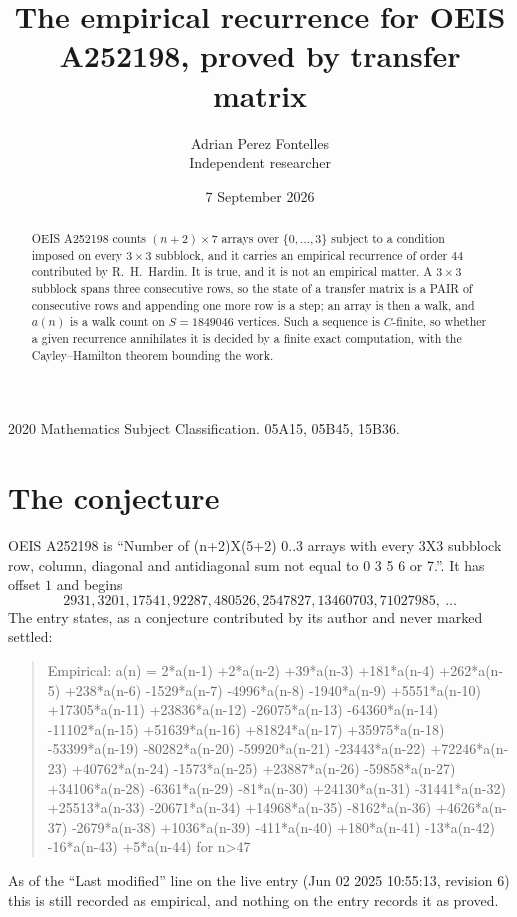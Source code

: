 \documentclass[11pt,a4paper]{article}
\title{The empirical recurrence for OEIS A252198, proved by transfer matrix}
\author{Adrian Perez Fontelles\\ \small Independent researcher}
\date{7 September 2026}
\theoremstyle{plain}
\theoremstyle{definition}
\begin{document}
\maketitle

\begin{abstract}
OEIS A252198 counts $(n+2)\times7$ arrays over $\{0,\dots,3\}$ subject to a condition imposed on
every $3\times3$ subblock, and it carries an empirical recurrence of order $44$
contributed by R.~H.~Hardin. It is true, and it is not an empirical matter. A $3\times3$
subblock spans three consecutive rows, so the state of a transfer matrix is a PAIR of
consecutive rows and appending one more row is a step; an array is then a walk, and
$a(n)$ is a walk count on $S=1849046$ vertices. Such a sequence is $C$-finite, so whether a given
recurrence annihilates it is decided by a finite exact computation, with the Cayley--Hamilton
theorem bounding the work.
\end{abstract}

\noindent\small 2020 Mathematics Subject Classification. 05A15, 05B45, 15B36.\normalsize

\section{The conjecture}

OEIS A252198 is ``Number of (n+2)X(5+2) 0..3 arrays with every 3X3 subblock row, column, diagonal and antidiagonal sum not equal to 0 3 5 6 or 7.''. It has offset $1$ and begins
\[
2931, 3201, 17541, 92287, 480526, 2547827, 13460703, 71027985,\ \dots
\]
The entry states, as a conjecture contributed by its author and never marked settled:
\begin{quote}
Empirical: a(n) = 2*a(n-1) +2*a(n-2) +39*a(n-3) +181*a(n-4) +262*a(n-5) +238*a(n-6) -1529*a(n-7) -4996*a(n-8) -1940*a(n-9) +5551*a(n-10) +17305*a(n-11) +23836*a(n-12) -26075*a(n-13) -64360*a(n-14) -11102*a(n-15) +51639*a(n-16) +81824*a(n-17) +35975*a(n-18) -53399*a(n-19) -80282*a(n-20) -59920*a(n-21) -23443*a(n-22) +72246*a(n-23) +40762*a(n-24) -1573*a(n-25) +23887*a(n-26) -59858*a(n-27) +34106*a(n-28) -6361*a(n-29) -81*a(n-30) +24130*a(n-31) -31441*a(n-32) +25513*a(n-33) -20671*a(n-34) +14968*a(n-35) -8162*a(n-36) +4626*a(n-37) -2679*a(n-38) +1036*a(n-39) -411*a(n-40) +180*a(n-41) -13*a(n-42) -16*a(n-43) +5*a(n-44) for n>47
\end{quote}
As of the ``Last modified'' line on the live entry (Jun 02 2025 10:55:13, revision 6) this is still
recorded as empirical, and nothing on the entry records it as proved.
\end{document}
